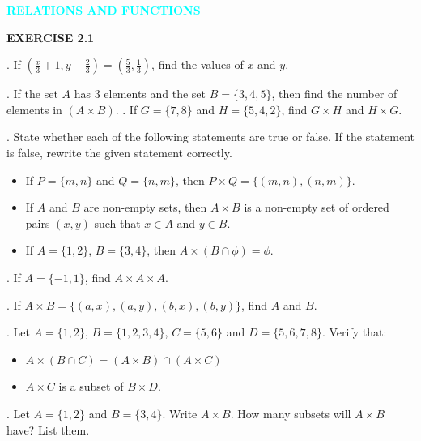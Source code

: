 \documentclass[11pt]{article}
\begin{document}
\thispagestyle{firstpage}
\vspace*{0.5cm}
\begin{center}
    \Large\textcolor{cyan}{\textbf{\large RELATIONS AND FUNCTIONS}}
\end{center}
\begin{center}
\begin{tcolorbox}[
  enhanced,
  width=0.25\textwidth,   
  colback=cyan!20,
  colframe=cyan!80!black,
  boxrule=1.2pt,
  arc=0mm,                
  left=10pt,
  right=10pt,
  top=8pt,
  bottom=8pt
]
\centering
\textbf{\textcolor{cyan!80!black}{EXERCISE 2.1}}
\end{tcolorbox}
\end{center}
. If $\left(\frac{x}{3}+1, y-\frac{2}{3}\right)=\left(\frac{5}{3}, \frac{1}{3}\right)$, find the values of $x$ and $y$.

. If the set $A$ has 3 elements and the set $B=\{3,4,5\}$, then find the number of elements in $(A\times B)$.
. If $G=\{7,8\}$ and $H=\{5,4,2\}$, find $G\times H$ and $H\times G$.

. State whether each of the following statements are true or false. If the statement is false, rewrite the given statement correctly.
\begin{itemize}
    \item[(i)] If $P=\{m,n\}$ and $Q=\{n,m\}$, then $P\times Q=\{(m,n),(n,m)\}$.
    \item[(ii)] If $A$ and $B$ are non-empty sets, then $A\times B$ is a non-empty set of ordered pairs $(x, y)$ such that $x\in A$ and $y\in B$.
    \item[(iii)] If $A=\{1,2\}$, $B=\{3,4\}$, then $A\times(B\cap\phi)=\phi$.
\end{itemize}

. If $A=\{-1,1\}$, find $A\times A\times A$.

. If $A\times B=\{(a,x),(a,y),(b,x),(b,y)\}$, find $A$ and $B$.

. Let $A=\{1,2\}$, $B=\{1,2,3,4\}$, $C=\{5,6\}$ and $D=\{5,6,7,8\}$. Verify that:
\begin{itemize}
    \item[(i)] $A\times(B\cap C)=(A\times B)\cap(A\times C)$
    \item[(ii)] $A\times C$ is a subset of $B\times D$.
\end{itemize}

. Let $A=\{1,2\}$ and $B=\{3,4\}$. Write $A\times B$. How many subsets will $A\times B$ have? List them.
\end{document}
